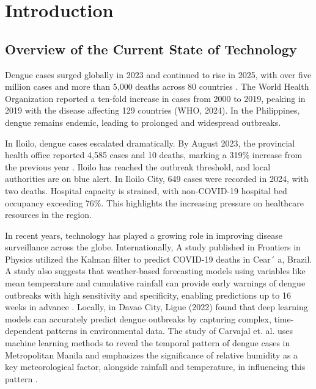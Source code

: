 \chapter{Introduction}
\label{sec:researchdesc}    %

\section{Overview of the Current State of Technology}
\label{sec:overview}

Dengue cases surged globally in 2023 and continued to rise in 2025, with over five million cases and more than 5,000 deaths across 80 countries \cite{bosano2023who}. The World Health Organization reported a ten-fold increase in cases from 2000 to 2019, peaking in 2019 with the disease affecting 129 countries (WHO, 2024). In the Philippines, dengue remains endemic, leading to prolonged and widespread outbreaks.

In Iloilo, dengue cases escalated dramatically. By August 2023, the provincial health office reported 4,585 cases and 10 deaths, marking a 319\% increase from the previous year \cite{lena2024}. Iloilo has reached the outbreak threshold, and local authorities are on blue alert. In Iloilo City, 649 cases were recorded in 2024, with two deaths. Hospital capacity is strained, with non-COVID-19 hospital bed occupancy exceeding 76\%. This highlights the increasing pressure on healthcare resources in the region.

In recent years, technology has played a growing role in improving disease surveillance across the globe. Internationally, A study published in Frontiers in Physics utilized the Kalman filter to predict COVID-19 deaths in Cear´ a, Brazil\cite{ahmadini2021analysis}. A study also suggests
that weather-based forecasting models using variables like mean temperature and cumulative rainfall can provide early warnings of dengue outbreaks with high sensitivity and specificity, enabling predictions up to 16 weeks in advance \cite{hii2012forecast}. Locally, in Davao City, Ligue (2022) found that deep learning models can accurately predict dengue outbreaks by capturing complex, time-dependent patterns in environmental data. The study of Carvajal et. al. uses machine learning methods to reveal the temporal pattern of dengue cases in Metropolitan Manila and emphasizes the significance of relative humidity as a key meteorological factor, alongside rainfall and temperature, in influencing this pattern \cite{carvajal2018machine}.

